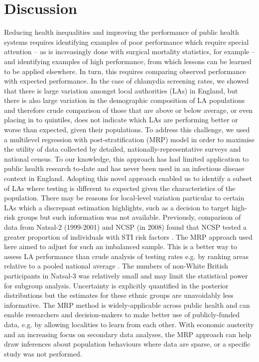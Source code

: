 \documentclass[fleqn,10pt]{wlscirep}
\begin{document}
\section*{Discussion}

Reducing health inequalities and improving the performance of public health systems requires identifying examples of poor performance which require special attention – as is increasingly done with surgical mortality statistics, for example – and identifying examples of high performance, from which lessons can be learned to be applied elsewhere. In turn, this requires comparing observed performance with expected performance. In the case of chlamydia screening rates, we showed that there is large variation amongst local authorities (LAs) in England, but there is also large variation in the demographic composition of LA populations and therefore crude comparison of those that are above or below average, or even placing in to quintiles, does not indicate which LAs are performing better or worse than expected, given their populations. To address this challenge, we used a multilevel regression with post-stratification (MRP) model in order to maximise the utility of data collected by detailed, nationally-representative surveys and national census.  To our knowledge, this approach has had limited application to public health research to-date \cite{Zhang2013} and has never been used in an infectious disease context in England. Adopting this novel approach enabled us to identify a subset of LAs where testing is different to expected given the characteristics of the population. There may be reasons for local-level variation particular to certain LAs which a discrepant estimation highlights, such as a decision to target high-risk groups but such information was not available.
Previously, comparison of data from Natsal-2 (1999-2001) and NCSP (in 2008) found that NCSP tested a greater proportion of individuals with STI risk factors \cite{Riha2011}. The MRP approach used here aimed to adjust for such an imbalanced sample. This is a better way to assess LA performance than crude analysis of testing rates e.g. by ranking areas relative to a pooled national average \cite{Editorial2016}. 
The numbers of non-White British participants in Natsal-3 was relatively small and may limit the statistical power for subgroup analysis. Uncertainty is explicitly quantified in the posterior distributions but the estimates for these ethnic groups are unavoidably less informative.
The MRP method is widely-applicable across public health and can enable researchers and decision-makers to make better use of publicly-funded data, e.g. by allowing localities to learn from each other. With economic austerity and an increasing focus on secondary data analyses, the MRP approach can help draw inferences about population behaviours where data are sparse, or a specific study was not performed.
\end{document}
